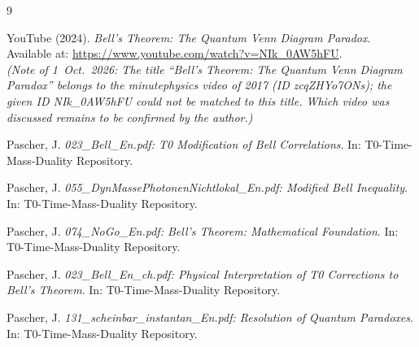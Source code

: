 	\begin{thebibliography}{9}
		
		YouTube (2024). \emph{Bell's Theorem: The Quantum Venn Diagram Paradox}. 
		Available at: \url{https://www.youtube.com/watch?v=NIk_0AW5hFU}.\\
		\textit{(Note of 1~Oct.~2026: The title ``Bell's Theorem: The Quantum Venn Diagram Paradox'' belongs to the minutephysics video of 2017 (ID zcqZHYo7ONs); the given ID NIk\_0AW5hFU could not be matched to this title. Which video was discussed remains to be confirmed by the author.)}
		
		Pascher, J. \emph{023\_Bell\_En.pdf: T0 Modification of Bell Correlations}. 
		In: T0-Time-Mass-Duality Repository. 
		
		Pascher, J. \emph{055\_DynMassePhotonenNichtlokal\_En.pdf: Modified Bell Inequality}. 
		In: T0-Time-Mass-Duality Repository. 
		
		Pascher, J. \emph{074\_NoGo\_En.pdf: Bell's Theorem: Mathematical Foundation}. 
		In: T0-Time-Mass-Duality Repository. 
		
		Pascher, J. \emph{023\_Bell\_En\_ch.pdf: Physical Interpretation of T0 Corrections to Bell's Theorem}. 
		In: T0-Time-Mass-Duality Repository. 
		
		Pascher, J. \emph{131\_scheinbar\_instantan\_En.pdf: Resolution of Quantum Paradoxes}. 
		In: T0-Time-Mass-Duality Repository. 
		
	\end{thebibliography}
	